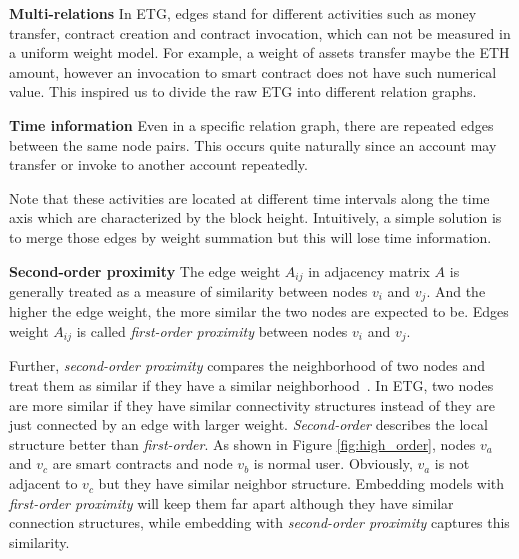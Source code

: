 \textbf{Multi-relations} In ETG, edges stand for different activities such as money transfer, contract creation and contract invocation, which can not be measured in a uniform weight model. For example, a weight of assets transfer maybe the ETH amount, however an invocation to smart contract does not have such numerical value. This inspired us to divide the raw ETG into different relation graphs.



\textbf{Time information} Even in a specific relation graph, there are repeated edges between the same node pairs. This occurs quite naturally since an account may transfer or invoke to another account repeatedly.

Note that these activities are located at different time intervals along the time axis which are characterized by the block height. Intuitively, a simple solution is to merge those edges by weight summation but this will lose time information. 

\textbf{Second-order proximity} The edge weight $A_{ij}$ in adjacency matrix $A$ is generally treated as a measure of similarity between nodes $v_i$ and $v_j$. And the higher the edge weight, the more similar the two nodes are expected to be. Edges weight $A_{ij}$ is called \emph{first-order proximity} between nodes $v_i$ and $v_j$. 

Further, \emph{second-order proximity} compares the neighborhood of two nodes and treat them as similar if they have a similar neighborhood~\cite{goyal2018graph}. In ETG, two nodes are more similar if they have similar connectivity structures instead of they are just connected by an edge with larger weight. \emph{Second-order} describes the local structure better than \emph{first-order}. As shown in Figure \ref{fig:high_order}, nodes $v_a$ and $v_c$ are smart contracts and node $v_b$ is normal user. Obviously, $v_a$ is not adjacent to $v_c$  but they have similar neighbor structure. Embedding models with \emph{first-order proximity} will keep them far apart although they have similar connection structures, while embedding with \emph{second-order proximity} captures this similarity.


